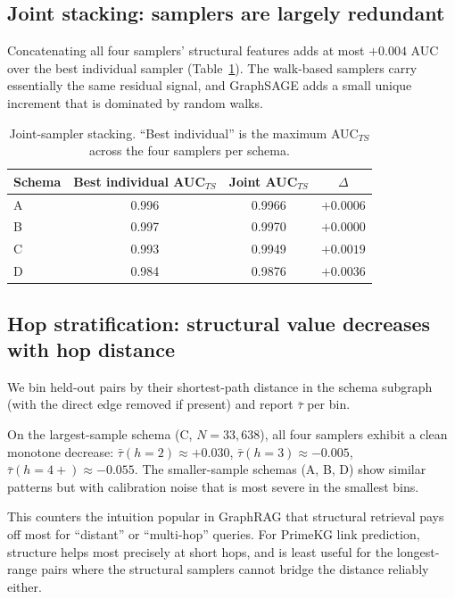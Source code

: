 \documentclass[11pt]{article}
\begin{document}
\subsection{Joint stacking: samplers are largely redundant}
\label{sec:joint}

Concatenating all four samplers' structural features adds at most $+0.004$ AUC over the best individual sampler (Table~\ref{tab:joint}). The walk-based samplers carry essentially the same residual signal, and GraphSAGE adds a small unique increment that is dominated by random walks.

\begin{table}[h!]
\centering
\caption{Joint-sampler stacking. ``Best individual'' is the maximum AUC$_{TS}$ across the four samplers per schema.}
\label{tab:joint}
\small
\begin{tabular}{l c c c}
\toprule
Schema & Best individual AUC$_{TS}$ & Joint AUC$_{TS}$ & $\Delta$ \\
\midrule
A & 0.996 & 0.9966 & $+0.0006$ \\
B & 0.997 & 0.9970 & $+0.0000$ \\
C & 0.993 & 0.9949 & $+0.0019$ \\
D & 0.984 & 0.9876 & $+0.0036$ \\
\bottomrule
\end{tabular}
\end{table}

\subsection{Hop stratification: structural value decreases with hop distance}
\label{sec:hops}

We bin held-out pairs by their shortest-path distance in the schema subgraph (with the direct edge removed if present) and report $\bar\tau$ per bin.

On the largest-sample schema (C, $N=33{,}638$), all four samplers exhibit a clean monotone decrease: $\bar\tau(h{=}2) \approx +0.030$, $\bar\tau(h{=}3) \approx -0.005$, $\bar\tau(h{=}4{+}) \approx -0.055$. The smaller-sample schemas (A, B, D) show similar patterns but with calibration noise that is most severe in the smallest bins.

This counters the intuition popular in GraphRAG that structural retrieval pays off most for ``distant'' or ``multi-hop'' queries. For PrimeKG link prediction, structure helps most precisely at short hops, and is least useful for the longest-range pairs where the structural samplers cannot bridge the distance reliably either.
\end{document}
